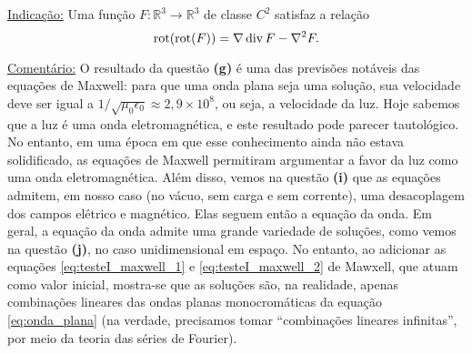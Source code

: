 \documentclass[11pt]{article}
\newcommand{\R}{\mathbb R}
\providecommand{\div}{}\renewcommand{\div}{\mathop{\rm div}\nolimits}
\DeclareMathOperator{\rot}{rot}
\begin{document}
\noindent\underline{Indicação:} 
Uma função $F\colon\R^3\rightarrow\R^3$ de classe $C^2$ satisfaz a relação
$$
\rot(\rot(F)) = \nabla \div F - \nabla^2 F.
$$

\noindent\underline{Comentário:} 
O resultado da questão \textbf{(g)} é uma das previsões notáveis das equações de Maxwell: para que uma onda plana seja uma solução, sua velocidade deve ser igual a $1/\sqrt{\mu_0\epsilon_0}\approx2,9\times10^{8}$, ou seja, a velocidade da luz. 
Hoje sabemos que a luz é uma onda eletromagnética, e este resultado pode parecer tautológico. 
No entanto, em uma época em que esse conhecimento ainda não estava solidificado, as equações de Maxwell permitiram argumentar a favor da luz como uma onda eletromagnética.
Além disso, vemos na questão \textbf{(i)} que as equações admitem, em nosso caso (no vácuo, sem carga e sem corrente), uma desacoplagem dos campos elétrico e magnético. Elas seguem então a equação da onda. 
Em geral, a equação da onda admite uma grande variedade de soluções, como vemos na questão \textbf{(j)}, no caso unidimensional em espaço.
No entanto, ao adicionar as equações \eqref{eq:testeI_maxwell_1} e \eqref{eq:testeI_maxwell_2} de Mawxell, que atuam como valor inicial, mostra-se que as soluções são, na realidade, apenas combinações lineares das ondas planas monocromáticas da equação \eqref{eq:onda_plana} (na verdade, precisamos tomar ``combinações lineares infinitas'', por meio da teoria das séries de Fourier).
\end{document}
